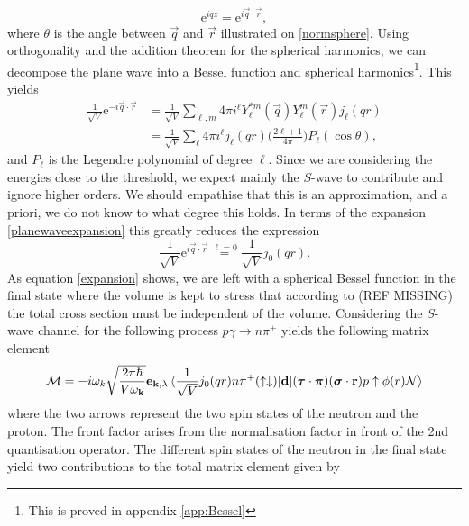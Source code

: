\begin{equation} \label{key}
	\text{e}^{iqz} = \text{e}^{i \vec{q}\cdot \vec{r}},
\end{equation}
where $\theta$ is the angle between $\vec{q}$ and $\vec{r}$ illustrated on \ref{normsphere}. Using orthogonality and the addition theorem for the spherical harmonics, we can decompose the plane wave into a Bessel function and spherical harmonics\footnote{This is proved in appendix \ref{app:Bessel}}. This yields
\begin{align}\label{planewaveexpansion}
	\frac{1}{\sqrt{V}} \text{e}^{-i\vec{q}\cdot\vec{r}} &= \frac{1}{\sqrt{V}} \sum_{\ell,m} 4\pi i^\ell Y_\ell^{*m}(\vec{q})Y_\ell^m(\vec{r})j_\ell(qr) \\
	&= \frac{1}{\sqrt{V}} \sum_\ell 4\pi i^\ell j_\ell(qr) \bigg( \frac{2\ell+1}{4\pi}\bigg)P_\ell(\cos\theta),
\end{align}
and $P_\ell$ is the Legendre polynomial of degree $\ell$. Since we are considering the energies close to the threshold, we expect mainly the $S$-wave to contribute and ignore higher orders. We should empathise that this is an approximation, and a priori, we do not know to what degree this holds. In terms of the expansion \eqref{planewaveexpansion} this greatly reduces the expression
\begin{equation} \label{expansion}
	\frac{1}{\sqrt{V}}\text{e}^{i\vec{q}\cdot \vec{r}} \stackrel{\ell=0}{=} \frac{1}{\sqrt{V}}j_0(qr).
\end{equation}
As equation \eqref{expansion} shows, we are left with a spherical Bessel function in the final state where the volume is kept to stress that according to (REF MISSING) the total cross section must be independent of the volume. Considering the $S$-wave channel for the following process $p \gamma \rightarrow n\pi^+$ yields the following matrix element
\begin{equation}
	\mathcal{M}=-i\omega_k\sqrt{\frac{2\pi\hbar}{V\omega_{\bm{\mathrm{k}}}}}\bm{\mathrm{e}}_{\bm{\mathrm{k}},\lambda}\mel*{\frac{1}{\sqrt{V}} j_0(qr)n\pi^+ (\uparrow \downarrow)}{\bm{\mathrm{d}}}{(\bm{\mathrm{\tau}}\cdot \bm{\mathrm{\pi}})(\bm{\mathrm{\sigma}}\cdot \bm{\mathrm{r}})p\uparrow \phi(r)\mathcal{N}}
\end{equation}
where the two arrows represent the two spin states of the neutron and the proton. The front factor arises from the normalisation factor in front of the 2nd quantisation operator. The different spin states of the neutron in the final state yield two contributions to the total matrix element given by
